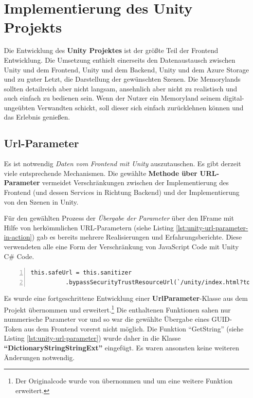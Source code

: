 \section{Implementierung des Unity Projekts}

Die Entwicklung des \textbf{Unity Projektes} ist der grö\ss{}te Teil der Frontend Entwicklung. Die Umsetzung enthielt einerseits den Datenaustausch zwischen Unity und dem Frontend, Unity und dem Backend, Unity und dem Azure Storage und zu guter Letzt, die Darstellung der gewünschten Szenen. Die Memorylands sollten detailreich aber nicht langsam, ansehnlich aber nicht zu realistisch und auch einfach zu bedienen sein. Wenn der Nutzer ein Memoryland seinem digital-ungeübten Verwandten schickt, soll dieser sich einfach zurücklehnen können und das Erlebnis genie\ss{}en.



\subsection{Url-Parameter}
\label{subsec:unity-url-parameter}

Es ist notwendig \emph{Daten vom Frontend mit Unity} auszutauschen. Es gibt derzeit viele entsprechende Mechanismen. Die gewählte \textbf{Methode über URL-Parameter} vermeidet Verschränkungen zwischen der Implementierung des Frontend (und dessen Services in Richtung Backend) und der Implementierung von den Szenen in Unity.


Für den gewählten Prozess der \emph{Übergabe der Parameter} über den IFrame mit Hilfe von herkömmlichen URL-Parametern (siehe Listing \ref{lst:unity-url-parameter-in-action}) gab es bereits mehrere Realisierungen und Erfahrungsberichte. Diese verwendeten alle eine Form der Verschränkung von JavaScript Code mit Unity C\# Code. 



\begin{lstlisting}[numbers=left,caption={IFrame for Unity in Frontend},label={lst:unity-url-parameter-in-action}]
this.safeUrl = this.sanitizer
          .bypassSecurityTrustResourceUrl(`/unity/index.html?token=${myToken}& server=${environment.apiConfig.uri}`);
\end{lstlisting}


Es wurde eine fortgeschrittene Entwicklung einer \textbf{UrlParameter}-Klasse aus dem Projekt übernommen und erweitert.\footnote{Der Originalcode wurde von \cite{UrlParameter} übernommen und um eine weitere Funktion erweitert.} Die enthaltenen Funktionen sahen nur nummerische Parameter vor und so war die gewählte Übergabe eines GUID-Token aus dem Frontend vorerst nicht möglich. Die Funktion ``GetString'' (siehe Listing \ref{lst:unity-url-parameter}) wurde daher in die Klasse \textbf{``DictionaryStringStringExt''} eingefügt. Es waren ansonsten keine weiteren Änderungen notwendig.

